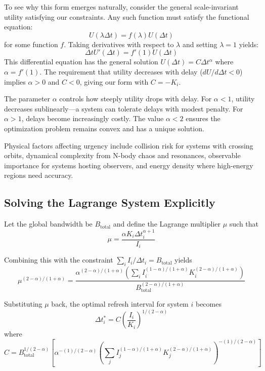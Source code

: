 \documentclass[twocolumn,prd,amsmath,amssymb,aps,superscriptaddress,nofootinbib]{revtex4-2}
\begin{document}
To see why this form emerges naturally, consider the general scale-invariant utility satisfying our constraints. Any such function must satisfy the functional equation:
\begin{equation}
U(\lambda \Delta t) = f(\lambda) U(\Delta t)
\end{equation}
for some function $f$. Taking derivatives with respect to $\lambda$ and setting $\lambda = 1$ yields:
\begin{equation}
\Delta t U'(\Delta t) = f'(1) U(\Delta t)
\end{equation}
This differential equation has the general solution $U(\Delta t) = C \Delta t^{\alpha}$ where $\alpha = f'(1)$. The requirement that utility decreases with delay ($dU/d\Delta t < 0$) implies $\alpha > 0$ and $C < 0$, giving our form with $C = -K_i$.

The parameter $\alpha$ controls how steeply utility drops with delay. For $\alpha < 1$, utility decreases sublinearly---a system can tolerate delays with modest penalty. For $\alpha > 1$, delays become increasingly costly. The value $\alpha < 2$ ensures the optimization problem remains convex and has a unique solution.

Physical factors affecting urgency include collision risk for systems with crossing orbits, dynamical complexity from N-body chaos and resonances, observable importance for systems hosting observers, and energy density where high-energy regions need accuracy.

\subsection{Solving the Lagrange System Explicitly}

Let the global bandwidth be $B_{\text{total}}$ and define the Lagrange multiplier $\mu$ such that
\begin{equation}
\mu = \frac{\alpha K_i \Delta t_i^{\alpha+1}}{I_i}
\end{equation}

Combining this with the constraint $\sum_i I_i / \Delta t_i = B_{\text{total}}$ yields
\begin{equation}
\mu^{(2-\alpha)/(1+\alpha)} = \frac{\alpha^{(2-\alpha)/(1+\alpha)} \left( \sum_i I_i^{(1-\alpha)/(1+\alpha)} K_i^{(2-\alpha)/(1+\alpha)} \right)}{B_{\text{total}}^{(2-\alpha)/(1+\alpha)}}
\end{equation}

Substituting $\mu$ back, the optimal refresh interval for system $i$ becomes
\begin{equation}
\Delta t_i^* = C \left( \frac{I_i}{K_i} \right)^{1/(2-\alpha)}
\end{equation}
where 
\begin{equation}
C = B_{\text{total}}^{1/(2-\alpha)} \left[ \alpha^{-(1)/(2-\alpha)} \left(\sum_j I_j^{(1-\alpha)/(1+\alpha)} K_j^{(2-\alpha)/(1+\alpha)} \right)^{-(1)/(2-\alpha)} \right]
\end{equation}
\end{document}
